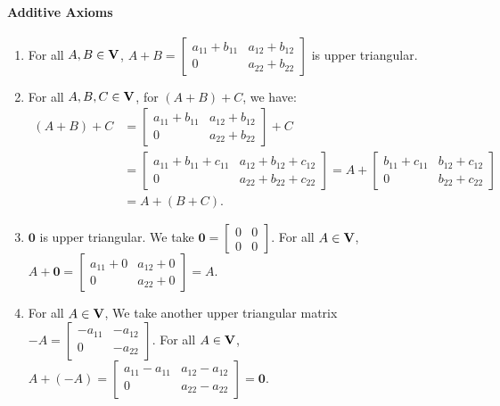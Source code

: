 \documentclass[10pt,addpoints,answers]{exam}
\begin{document}
\begin{questions}
\begin{parts}
{    \paragraph{Additive Axioms}
    \begin{enumerate}
      \item For all $A, B \in {\bf V}$, $A + B = \begin{bmatrix}
        a_{11} + b_{11} & a_{12} + b_{12} \\
        0 & a_{22} + b_{22}
      \end{bmatrix}$ is upper triangular.
      \item For all $A, B, C \in {\bf V}$, for $(A+B)+C$, we have:
      \begin{equation*}
      \begin{aligned}
        (A+B)+C &= \begin{bmatrix}
          a_{11} + b_{11} & a_{12} + b_{12} \\
          0 & a_{22} + b_{22}
        \end{bmatrix} + C \\
        &= \begin{bmatrix}
          a_{11} + b_{11} + c_{11} & a_{12} + b_{12} + c_{12} \\
          0 & a_{22} + b_{22} + c_{22}
        \end{bmatrix} 
        = A + \begin{bmatrix}
          b_{11} + c_{11} & b_{12} + c_{12} \\
          0 & b_{22} + c_{22}
        \end{bmatrix} \\
        &= A + (B+C).
      \end{aligned}
    \end{equation*}
      \item $\mathbf{0}$ is upper triangular. We take $\textbf{0} = \begin{bmatrix}
        0 & 0 \\
        0 & 0
      \end{bmatrix}$. For all $A \in {\bf V}$, $A + \textbf{0} = \begin{bmatrix}
        a_{11} + 0 & a_{12} + 0 \\
        0 & a_{22} + 0
      \end{bmatrix} = A$.
      \item For all $A \in {\bf V}$, We take another upper triangular matrix $-A = \begin{bmatrix}
        -a_{11} & -a_{12} \\
        0 & -a_{22}
      \end{bmatrix}$. For all $A \in {\bf V}$, $A + (-A) = \begin{bmatrix}
        a_{11} - a_{11} & a_{12} - a_{12} \\
        0 & a_{22} - a_{22}
      \end{bmatrix} = \textbf{0}$.
    \end{enumerate}
}
\end{parts}
\end{questions}
\end{document}
